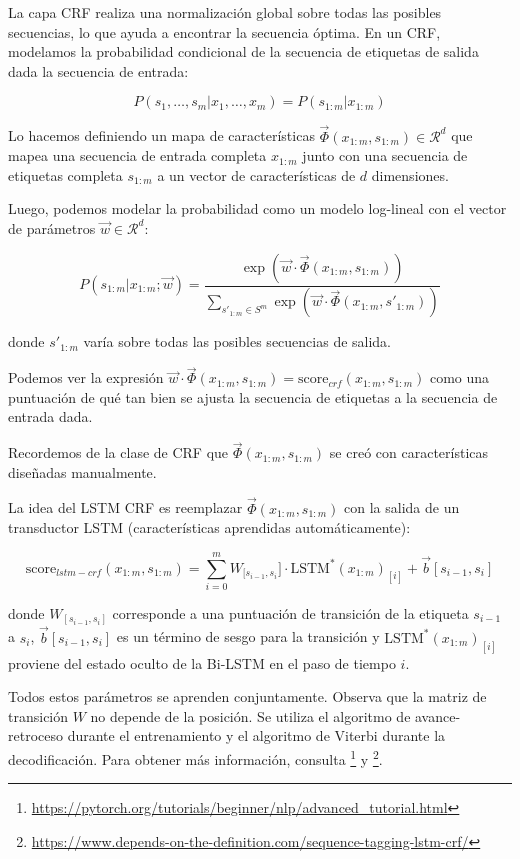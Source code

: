 La capa CRF realiza una normalización global sobre todas las posibles secuencias, lo que ayuda a encontrar la secuencia óptima. En un CRF, modelamos la probabilidad condicional de la secuencia de etiquetas de salida dada la secuencia de entrada:

\begin{displaymath}
P(s_1, \dots, s_m | x_1, \dots, x_m) = P(s_{1:m}|x_{1:m})
\end{displaymath}

Lo hacemos definiendo un mapa de características $\vec{\Phi}(x_{1:m},s_{1:m}) \in \mathcal{R}^d$ que mapea una secuencia de entrada completa $x_{1:m}$ junto con una secuencia de etiquetas completa $s_{1:m}$ a un vector de características de $d$ dimensiones.

Luego, podemos modelar la probabilidad como un modelo log-lineal con el vector de parámetros $\vec{w} \in \mathcal{R}^d$:

\begin{displaymath}
P(s_{1:m}|x_{1:m}; \vec{w}) = \frac{\exp (\vec{w} \cdot \vec{\Phi}(x_{1:m},s_{1:m}))}{\sum_{s'_{1:m} \in S^m}\exp (\vec{w} \cdot \vec{\Phi}(x_{1:m},s'_{1:m}))}
\end{displaymath}

donde $s'_{1:m}$ varía sobre todas las posibles secuencias de salida.

Podemos ver la expresión $\vec{w} \cdot \vec{\Phi}(x_{1:m},s_{1:m})= \text{score}_{crf}(x_{1:m},s_{1:m})$ como una puntuación de qué tan bien se ajusta la secuencia de etiquetas a la secuencia de entrada dada.

Recordemos de la clase de CRF que $\vec{\Phi}(x_{1:m},s_{1:m})$ se creó con características diseñadas manualmente.

La idea del LSTM CRF es reemplazar $\vec{\Phi}(x_{1:m},s_{1:m})$ con la salida de un transductor LSTM (características aprendidas automáticamente):

\begin{displaymath}
\text{score}_{lstm-crf}(x_{1:m},s_{1:m})= \sum_{i=0}^{m} W_{[s_{i-1},s_i}]\cdot\text{LSTM}^*(x_{1:m})_{[i]} +\vec{b}{[s_{i-1},s_i]}
\end{displaymath}

donde $W_{[s_{i-1},s_i]}$ corresponde a una puntuación de transición de la etiqueta $s_{i-1}$ a $s_i$, $\vec{b}{[s_{i-1},s_i]}$ es un término de sesgo para la transición y $\text{LSTM}^*(x_{1:m})_{[i]}$ proviene del estado oculto de la Bi-LSTM en el paso de tiempo $i$.

Todos estos parámetros se aprenden conjuntamente. Observa que la matriz de transición $W$ no depende de la posición. Se utiliza el algoritmo de avance-retroceso durante el entrenamiento y el algoritmo de Viterbi durante la decodificación. Para obtener más información, consulta \footnote{\url{https://pytorch.org/tutorials/beginner/nlp/advanced_tutorial.html}} y \footnote{\url{https://www.depends-on-the-definition.com/sequence-tagging-lstm-crf/}}.
